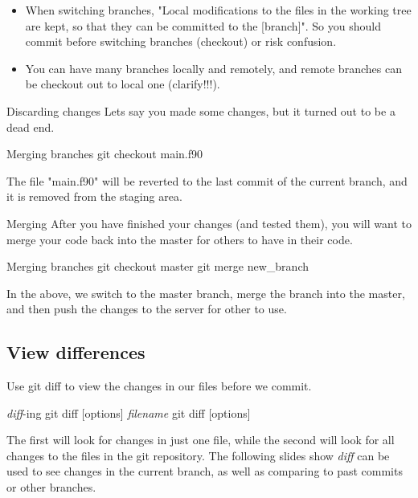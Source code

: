 \documentclass{beamer}
\begin{document}
\begin{frame}
\begin{itemize}
\item When switching branches, "Local modifications to the files in the working tree are kept, 
	so that they can be committed to the [branch]". So you should commit before switching branches (checkout) 
	or risk confusion.
\item You can have many branches locally and remotely, and remote branches can be checkout 
	out to local one (clarify!!!).
\end{itemize}
\end{frame}

\begin{frame}{Discarding changes}
Lets say you made some changes, but it turned out to be a dead end.
\begin{block}{Merging branches}
git checkout main.f90
\end{block}
The file "main.f90" will be reverted to the last commit of the current branch, and it is removed from the staging area.
\end{frame}

\begin{frame}{Merging}
After you have finished your changes (and tested them), you will want to merge your code back 
into the master for others to have in their code. 
\begin{block}{Merging branches}
git checkout master \newline
git merge new\_branch 
\end{block}
In the above, we switch to the master branch, merge the branch into the master, and then push the 
changes to the server for other to use.
\end{frame}





%
%
%
\subsection{View differences}

\begin{frame}
Use \alert{git diff} to view the changes in our files before we commit.
\begin{block}{\textit{diff}-ing}
git diff [options] \textit{filename} \newline
git diff [options]
\end{block}
The first will look for changes in just one file, while the second will look for all changes to the files in the git repository. The following slides show \textit{diff} can be used to see changes in the current branch, as well as comparing to past commits or other branches.

\end{frame}
\end{document}
